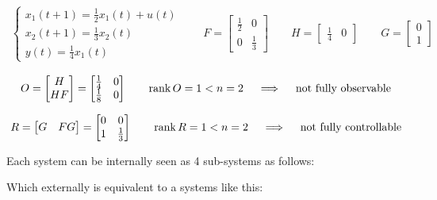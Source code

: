 \begin{example}
    \begin{align*}
        \begin{cases}
            x_1(t+1) = \frac{1}{2} x_1(t) + u(t) \\
            x_2(t+1) = \frac{1}{3}x_2(t) \\
            y(t) = \frac{1}{4}x_1(t)
        \end{cases}
        \qquad
        F = \begin{bmatrix}
            \frac{1}{2} & 0 \\
            0 & \frac{1}{3}
        \end{bmatrix}
        \qquad
        H = \begin{bmatrix}
            \frac{1}{4} & 0
        \end{bmatrix}
        \qquad
        G = \begin{bmatrix}
            0 \\
            1
        \end{bmatrix}
    \end{align*}

    \[
        O = \begin{bmatrix}
            H \\
            HF
        \end{bmatrix} = \begin{bmatrix}
            \frac{1}{4} & 0 \\
            \frac{1}{8} & 0
        \end{bmatrix}
        \qquad
        \operatorname{rank} O = 1 < n = 2
        \quad\implies\quad \text{not fully observable}
    \]

    \[
        R = \begin{bmatrix}
            G & FG
        \end{bmatrix} = \begin{bmatrix}
            0 & 0 \\
            1 & \frac{1}{3}
        \end{bmatrix}
        \qquad
        \operatorname{rank} R = 1 < n = 2
        \quad\implies\quad \text{not fully controllable}
    \]
\end{example}

\begin{remark}
    Each system can be internally seen as 4 sub-systems as follows:

    Which externally is equivalent to a systems like this:
\end{remark}

